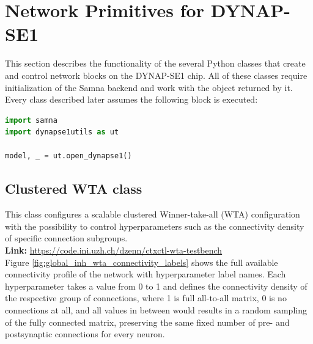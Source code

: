  \chapter{Network Primitives for DYNAP-SE1}
 \label{appendix:network_primitives}

 This section describes the functionality of the several Python classes that create and control network blocks on the DYNAP-SE1 chip.
 All of these classes require initialization of the Samna backend and work with the  object returned by it.\\
 
 Every class described later assumes the following block is executed:

 \begin{lstlisting}[language=Python, caption=Initialization of locally connected DYNAP-SE1 board]
import samna
import dynapse1utils as ut

model, _ = ut.open_dynapse1()
\end{lstlisting}

 \section{Clustered WTA class}
 
 This class configures a scalable clustered Winner-take-all (WTA) configuration with the possibility to control hyperparameters such as the connectivity density of specific connection subgroups.\\

\noindent\textbf{Link:} \url{https://code.ini.uzh.ch/dzenn/ctxctl-wta-testbench}\\

 Figure \ref{fig:global_inh_wta_connectivity_labels} shows the full available connectivity profile of the network with hyperparameter label names. Each hyperparameter takes a value from 0 to 1 and defines the connectivity density of the respective group of connections, where 1 is full all-to-all matrix, 0 is no connections at all, and all values in between would results in a random sampling of the fully connected matrix, preserving the same fixed number of pre- and postsynaptic connections for every neuron.

